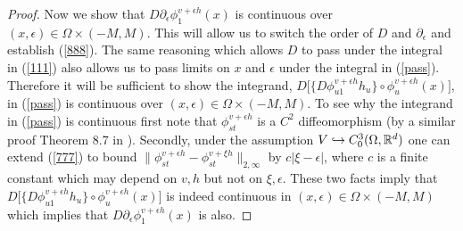 \documentclass[noinfoline]{imsart}
\begin{document}
\begin{proof}
Now we show that $D {\partial_\epsilon}  \phi^{ v+\epsilon h}_{1}(x)$ is continuous  over $(x,\epsilon)\in \Omega\times (-M,M)$. This will allow us to switch the order of $D$ and $\partial_\epsilon$ and establish (\ref{888}). The same reasoning which allows $D$ to pass under the integral in (\ref{111})  also allows us to pass limits on $x$ and $\epsilon$ under the integral in (\ref{pass}). Therefore it will be sufficient to show the integrand, $ D\bigl[ \{D\phi_{u1}^{v+\epsilon h} h_u  \}\circ \phi_u^{v+\epsilon h}(x)  \bigr]$,  in (\ref{pass}) is continuous  over $(x,\epsilon)\in \Omega\times (-M,M)$.
To see why   the integrand in (\ref{pass})  is continuous first note that $ \phi^{ v+\epsilon h}_{st}$ is a $C^2$ diffeomorphism (by a similar proof Theorem 8.7 in \cite{you:10}). Secondly, under the assumption $V\hookrightarrow C_0^3(\Omega, \Bbb R^d)$ one can extend (\ref{777}) to bound  $\| \phi_{st}^{v+\epsilon h} - \phi_{st}^{v+\xi h} \|_{2,\infty}$ by $c|\xi - \epsilon|$, where $c$ is a finite constant which may depend on $v,h$ but not on $\xi, \epsilon$. These two facts imply that $ D\bigl[ \{D\phi_{u1}^{v+\epsilon h} h_u  \}\circ \phi_u^{v+\epsilon h}(x)  \bigr]$ is indeed continuous in $(x,\epsilon)\in \Omega\times (-M,M)$ which implies that $D {\partial_\epsilon}  \phi^{ v+\epsilon h}_{1}(x)$ is also.


\end{proof}
\end{document}
